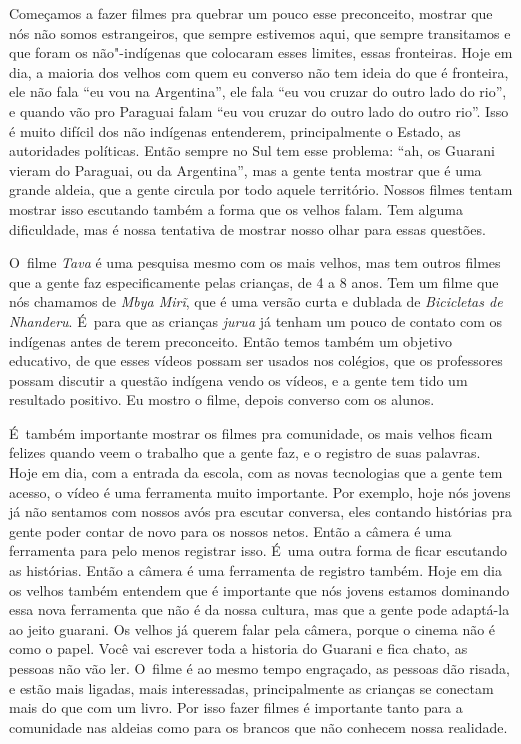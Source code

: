 Começamos a fazer filmes pra quebrar um pouco esse preconceito, mostrar
que nós não somos estrangeiros, que sempre estivemos aqui, que sempre
transitamos e que foram os não"-indígenas que colocaram esses limites,
essas fronteiras. Hoje em dia, a maioria dos velhos com quem eu
converso não tem ideia do que é fronteira, ele não fala ``eu vou na
Argentina'', ele fala ``eu vou cruzar do outro lado do rio'', e quando vão
pro Paraguai falam ``eu vou cruzar do outro lado do outro rio''. Isso é
muito difícil dos não indígenas entenderem, principalmente o Estado, as
autoridades políticas. Então sempre no Sul tem esse problema: ``ah, os
Guarani vieram do Paraguai, ou da Argentina'', mas a gente tenta mostrar
que é uma grande aldeia, que a gente circula por todo aquele
território. Nossos filmes tentam mostrar isso escutando também a forma
que os velhos falam. Tem alguma dificuldade, mas é nossa tentativa de
mostrar nosso olhar para essas questões.

O~filme \emph{Tava} é uma pesquisa mesmo com os mais velhos, mas tem outros
filmes que a gente faz especificamente pelas crianças, de 4 a 8 anos.
Tem um filme que nós chamamos de \emph{Mbya Mirĩ}, que é uma
versão curta e dublada de \emph{Bicicletas de Nhanderu}. É~para que as
crianças \emph{jurua} já tenham um pouco de contato com os indígenas antes de
terem preconceito. Então temos também um objetivo educativo, de que
esses vídeos possam ser usados nos colégios, que os professores possam
discutir a questão indígena vendo os vídeos, e a gente tem tido um
resultado positivo. Eu mostro o filme, depois converso com os alunos. 

É~também importante mostrar os filmes pra comunidade, os mais velhos
ficam felizes quando veem o trabalho que a gente faz, e o registro de
suas palavras. Hoje em dia, com a entrada da escola, com as novas
tecnologias que a gente tem acesso, o vídeo é uma ferramenta muito
importante. Por exemplo, hoje nós jovens já não sentamos com nossos
avós pra escutar conversa, eles contando histórias pra gente poder
contar de novo para os nossos netos. Então a câmera é uma ferramenta
para pelo menos registrar isso. É~uma outra forma de ficar escutando as
histórias. Então a câmera é uma ferramenta de registro também. Hoje em
dia os velhos também entendem que é importante que nós jovens estamos
dominando essa nova ferramenta que não é da nossa cultura, mas que a
gente pode adaptá-la ao jeito guarani. Os velhos já querem falar pela
câmera, porque o cinema não é como o papel. Você vai escrever toda a
historia do Guarani e fica chato, as pessoas não vão ler. O~filme é ao
mesmo tempo engraçado, as pessoas dão risada, e estão mais ligadas,
mais interessadas, principalmente as crianças se conectam mais do que
com um livro. Por isso fazer filmes é importante tanto para a
comunidade nas aldeias como para os brancos que não conhecem nossa
realidade.

